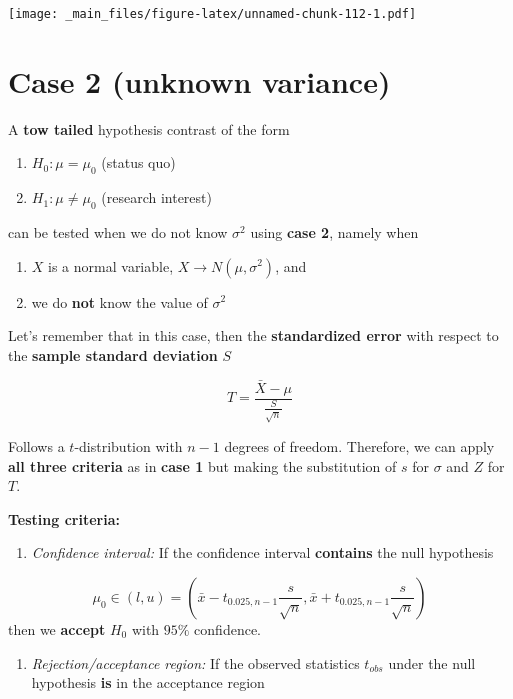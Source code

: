\documentclass[
]{book}
\providecommand{\tightlist}{%
  \setlength{\itemsep}{0pt}\setlength{\parskip}{0pt}}
\begin{document}
\texttt{[image: \_main\_files/figure-latex/unnamed-chunk-112-1.pdf]}

\hypertarget{case-2-unknown-variance-1}{%
\section{Case 2 (unknown variance)}\label{case-2-unknown-variance-1}}

A \textbf{tow tailed} hypothesis contrast of the form

\begin{enumerate}
\def\labelenumi{\alph{enumi}.}
\tightlist
\item
  \(H_0:\mu = \mu_0\) (status quo)
\item
  \(H_1:\mu \neq \mu_0\) (research interest)
\end{enumerate}

can be tested when we do not know \(\sigma^2\) using \textbf{case 2}, namely when

\begin{enumerate}
\def\labelenumi{\arabic{enumi}.}
\tightlist
\item
  \(X\) is a normal variable, \(X \rightarrow N(\mu, \sigma^2)\), and
\item
  we do \textbf{not} know the value of \(\sigma^2\)
\end{enumerate}

Let's remember that in this case, then the \textbf{standardized error} with respect to the \textbf{sample standard deviation} \(S\)

\[T=\frac{\bar{X}-\mu}{\frac{S}{\sqrt{n}}}\]

Follows a \(t\)-distribution with \(n-1\) degrees of freedom. Therefore, we can apply \textbf{all three criteria} as in \textbf{case 1} but making the substitution of \(s\) for \(\sigma\) and \(Z\) for \(T\).

\textbf{Testing criteria:}

\begin{enumerate}
\def\labelenumi{\arabic{enumi}.}
\tightlist
\item
  \emph{Confidence interval:} If the confidence interval \textbf{contains} the null hypothesis
\end{enumerate}

\[\mu_0\in (l,u)=(\bar{x}-t_{0.025,n-1} \frac{s}{\sqrt{n}}, \bar{x}+t_{0.025,n-1} \frac{s}{\sqrt{n}})\] then we \textbf{accept} \(H_0\) with \(95\%\) confidence.

\begin{enumerate}
\def\labelenumi{\arabic{enumi}.}
\setcounter{enumi}{1}
\tightlist
\item
  \emph{Rejection/acceptance region:} If the observed statistics \(t_{obs}\) under the null hypothesis \textbf{is} in the acceptance region
\end{enumerate}
\end{document}
